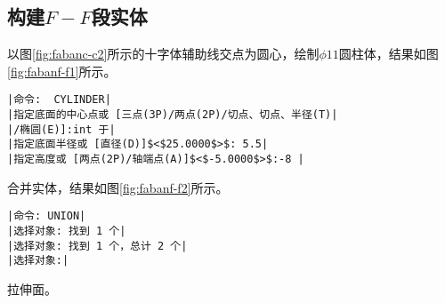 \subsection{构建$F-F$段实体}
\begin{procedure}
\item 以图\ref{fig:fabanc-c2}所示的十字体辅助线交点为圆心，绘制$\phi 11$圆柱体，结果如图\ref{fig:fabanf-f1}所示。
\begin{lstlisting}
|命令:  CYLINDER|
|指定底面的中心点或 [三点(3P)/两点(2P)/切点、切点、半径(T)|
|/椭圆(E)]:int 于|
|指定底面半径或 [直径(D)]$<$25.0000$>$: 5.5|
|指定高度或 [两点(2P)/轴端点(A)]$<$-5.0000$>$:-8 |
\end{lstlisting}
\item 合并实体，结果如图\ref{fig:fabanf-f2}所示。
\begin{lstlisting}
|命令: UNION|
|选择对象: 找到 1 个|
|选择对象: 找到 1 个，总计 2 个|
|选择对象:|
\end{lstlisting}
\begin{figure}[htbp]
\centering
\begin{floatrow}[3]
\end{floatrow}
\end{figure}
\item 拉伸面。


\end{procedure}
